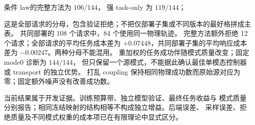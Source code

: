 条件 law的完整方法为 $106/144$，
强 task-only 为 $119/144$；

这是全部请求的分母，包含验证拒绝；不把仅部署子集或不同版本的最好格拼成主表。
共同部署的 108 个请求中，84 个使用同一物理轨迹。
完整方法额外拒绝 12 个请求；全部请求的平均任务成本差为
$+0.07448$，共同部署子集的平均响应成本差为
$-0.00247$。两种分母不能混用。
重加权的任务成功伴随模式质量改变；固定 mode0 诊断为 $144/144$，
但只保留一个源模式，不能据此确认最佳单模态控制器或 transport 的独立优势。
打乱 coupling 保持相同物理成功数而原始源对应为零；固定额外噪声没有改善成功数。

当前结果属于开发证据。训练预算带、独立模型验证、最终任务收益与
模式质量分别报告；相同冻结映射的结构相等不构成独立增益。后端误差、
采样误差、拒绝质量及不同模式权重的成本项已在有限理论中显式区分。
